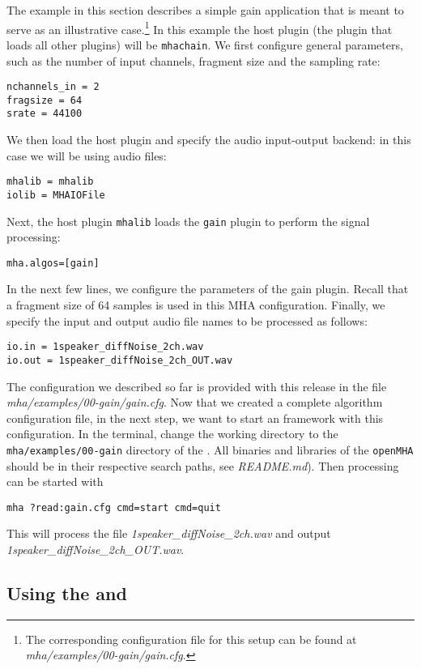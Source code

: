 The example in this section describes a simple gain application
that is meant to serve as an illustrative case.\footnote{
  The corresponding configuration file for this setup can be found at
  \emph{mha/examples/00-gain/gain.cfg}.
}
%
In this example the host plugin (the plugin that loads all other
plugins) will be \verb!mhachain!.
%
We first configure general parameters, such as the number of input 
channels, fragment size and the sampling rate:
\begin{verbatim}
nchannels_in = 2
fragsize = 64
srate = 44100
\end{verbatim}
%
We then load the host plugin and specify the audio input-output backend:
in this case we will be using audio files:
\begin{verbatim}
mhalib = mhalib
iolib = MHAIOFile
\end{verbatim}
%
Next, the host plugin \verb!mhalib! loads the \verb!gain! plugin
to perform the signal processing:
\begin{verbatim}
mha.algos=[gain]
\end{verbatim}
%
In the next few lines, we configure the parameters of the gain
plugin.
%
Recall that a fragment size of 64 samples is used in this MHA configuration.
%
Finally, we specify the input and output audio file names to be processed as 
follows:
\begin{verbatim}
io.in = 1speaker_diffNoise_2ch.wav
io.out = 1speaker_diffNoise_2ch_OUT.wav
\end{verbatim}
The configuration we described so far is provided with this release 
in the file \emph{mha/examples/00-gain/gain.cfg}.
Now that we created a complete \mha{} algorithm configuration file,
in the next step, we want to start an \mha{} framework with this configuration.
%
In the terminal, change the working directory to the
\verb!mha/examples/00-gain!
directory of the \mha{}.
All binaries and libraries of the \verb!openMHA! should be in their respective
search paths, see \emph{README.md}).
Then \mha{} processing can be started with
\begin{verbatim}
mha ?read:gain.cfg cmd=start cmd=quit
\end{verbatim}
%
This will process the file \emph{1speaker\_diffNoise\_2ch.wav} and output 
\emph{1speaker\_diffNoise\_2ch\_OUT.wav}.
\subsection{Using the \mhad{} and \Matlab{}}

